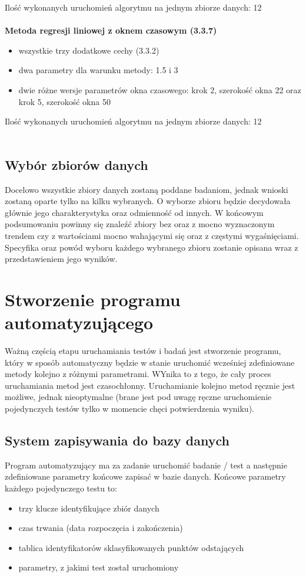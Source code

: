 \documentclass[eng,printmode]{mgr}
\begin{document}
Ilość wykonanych uruchomień algorytmu na jednym zbiorze danych: 12
\\\\
\textbf{Metoda regresji liniowej z oknem czasowym (3.3.7)}
\begin{itemize}
	\item wszystkie trzy dodatkowe cechy (3.3.2)
	\item dwa parametry dla warunku metody: 1.5 i 3
	\item dwie różne wersje parametrów okna czasowego: krok 2, szerokość okna 22 oraz krok 5, szerokość okna 50
\end{itemize}
Ilość wykonanych uruchomień algorytmu na jednym zbiorze danych: 12
\\\\
\subsection{Wybór zbiorów danych}
Docelowo wszystkie zbiory danych zostaną poddane badaniom, jednak wnioski zostaną oparte tylko na kilku wybranych. O wyborze zbioru będzie decydowała głównie jego charakterystyka oraz odmienność od innych. W końcowym podsumowaniu powinny się znaleźć zbiory bez oraz z mocno wyznaczonym trendem czy z wartościami mocno wahającymi się oraz z częstymi wygaśnięciami.\\
Specyfika oraz powód wyboru każdego wybranego zbioru zostanie opisana wraz z przedstawieniem jego wyników.
\section{Stworzenie programu automatyzującego}
Ważną częścią etapu uruchamiania testów i badań jest stworzenie programu, który w sposób automatyczny będzie w stanie uruchomić wcześniej zdefiniowane metody kolejno z różnymi parametrami. WYnika to z tego, że cały proces uruchamiania metod jest czasochłonny. Uruchamianie kolejno metod ręcznie jest możliwe, jednak nieoptymalne (brane jest pod uwagę ręczne uruchomienie pojedynczych testów tylko w momencie chęci potwierdzenia wyniku). 

\subsection{System zapisywania do bazy danych}
Program automatyzujący ma za zadanie uruchomić badanie / test a następnie zdefiniowane parametry końcowe zapisać w bazie danych. Końcowe parametry każdego pojedynczego testu to:
\begin{itemize}
	\item trzy klucze identyfikujące zbiór danych
	\item czas trwania (data rozpoczęcia i zakończenia)
	\item tablica identyfikatorów sklasyfikowanych punktów odstających
	\item parametry, z jakimi test został uruchomiony
\end{itemize}
\end{document}
